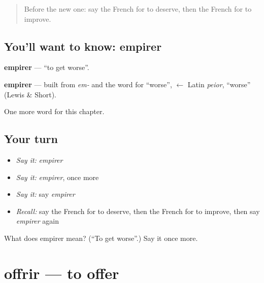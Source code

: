 \label{lesson:FR-C237-empirer}



\begin{quote}
Before the new one: say the French for to deserve, then the French for to improve.
\end{quote}

\subsection*{You'll want to know: empirer}
\textbf{empirer} — \textquotedblleft{}to get worse\textquotedblright{}.

\begin{cousinweb}
\textbf{empirer} — built from \emph{em-} and the word for \textquotedblleft{}worse\textquotedblright{}, $\leftarrow$ Latin \emph{peior}, \textquotedblleft{}worse\textquotedblright{} (Lewis \& Short).
\end{cousinweb}

\begin{grammarlens}[title={What you've built}]
One more word for this chapter.
\end{grammarlens}

\subsection*{Your turn}
\begin{itemize}
\raggedright
  \item \emph{Say it:} \emph{empirer}
  \item \emph{Say it:} \emph{empirer}, once more
  \item \emph{Say it:} say \emph{empirer}
  \item \emph{Recall:} say the French for to deserve, then the French for to improve, then say \emph{empirer} again
\end{itemize}

\begin{tcolorbox}[breakable,colback=teal!4,colframe=teal!35!black,title={Before you move on}]
What does empirer mean? (\textquotedblleft{}To get worse\textquotedblright{}.) Say it once more.
\end{tcolorbox}
\section[offrir]{offrir — to offer}

\label{lesson:FR-C237-offrir}



